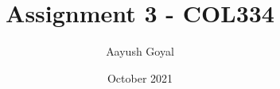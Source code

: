\documentclass{article}
\title{Assignment 3 - COL334}
\author{Aayush Goyal}
\date{October 2021}
\begin{document}
\maketitle


\section{}
\section{}
\section{}

\end{document}
